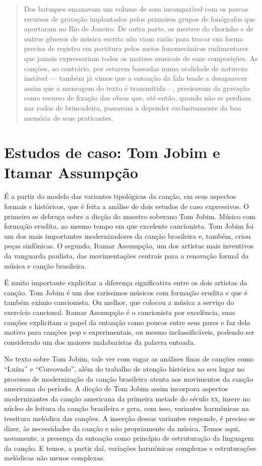 \begin{quote}
Dos batuques emanavam um volume de som incompatível com os parcos
recursos de gravação implantados pelos primeiros grupos de fonógrafos
que aportaram no Rio de Janeiro. De outra parte, os mestres do chorinho
e de outros gêneros de música escrita não viam razão para trocar sua
forma precisa de registro em partitura pelos meios fonomecânicos
rudimentares que jamais expressariam todos os matizes musicais de suas
composições. As canções, ao contrário, por estarem baseadas numa
oralidade de natureza instável --- também já vimos que a entoação da fala
tende a desaparecer assim que a mensagem do texto é transmitida---,
precisavam da gravação como recurso de fixação das obras que, até então,
quando não se perdiam nas rodas de brincadeira, passavam a depender
exclusivamente da boa memória de seus praticantes.
\end{quote}

\section{Estudos de caso: Tom Jobim e Itamar Assumpção}

É a partir do modelo das variantes tipológicas da canção, em seus
aspectos formais e históricos, que é feita a análise de dois estudos de
caso expressivos. O primeiro se debruça sobre a dicção do maestro
soberano Tom Jobim. Músico com formação erudita, ao mesmo tempo em que
excelente cancionista. Tom Jobim foi um dos mais importantes
modernizadores da canção brasileira e, também, criou peças sinfônicas. O
segundo, Itamar Assumpção, um dos artistas mais inventivos da
vanguarda paulista, das movimentações centrais para a renovação
formal da música e canção brasileira.

É muito importante explicitar a diferença significativa entre os dois
artistas da canção. Tom Jobim é um dos raríssimos músicos com formação
erudita e que é também exímio cancionista. Ou melhor, que colocou a
música a serviço do exercício cancional. Itamar Assumpção é o
cancionista por excelência, suas canções explicitam o papel da entoação
como poucos entre seus pares e faz dela motivo para canções pop e
experimentais, ou mesmo inclassificáveis, podendo ser considerado um dos
maiores malabaristas da palavra entoada.

No texto sobre Tom Jobim, vale ver com vagar as análises finas de
canções como ``Luíza'' e ``Corcovado'', além do trabalho de atenção
histórica ao seu lugar no processo de modernização da canção brasileira
atenta aos movimentos da canção americana do período. A dicção de Tom
Jobim assim incorpora aspectos modernizantes da canção americana da
primeira metade do século \textsc{xx}, insere no núcleo de feitura da canção
brasileira e gera, com isso, variantes harmônicas na tessitura melódica
das canções. A inserção dessas variantes responde, é preciso se dizer,
às necessidades da canção e não propriamente da música. Temos aqui,
novamente, a presença da entoação como princípio de estruturação da
linguagem da canção. E temos, a partir daí, variações harmônicas
complexas e estruturações melódicas não menos complexas.

